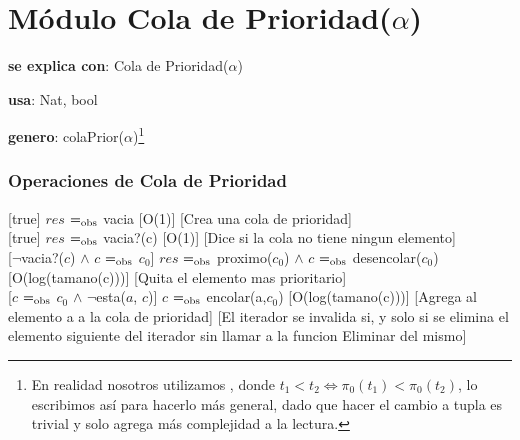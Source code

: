 


\section{Módulo Cola de Prioridad($\alpha$)}

\begin{Interfaz}

  \textbf{se explica con}: Cola de Prioridad($\alpha$)

  \textbf{usa}: Nat, bool
  
  \textbf{genero}: colaPrior($\alpha$)\footnote{En realidad nosotros utilizamos , donde $t_1 < t_2 \iff \pi_0(t_1) < \pi_0(t_2)$, lo escribimos así para hacerlo más general, dado que hacer el cambio a tupla es trivial y solo agrega más complejidad a la lectura.}


\subsubsection{Operaciones de Cola de Prioridad}

  [true]
  {$res$ $=_{\mathrm{obs}}$ vacia}
  [O(1)]
  [Crea una cola de prioridad]\\ 
  
  [true]
  {$res$ $=_{\mathrm{obs}}$ vacia?(c)}
  [O(1)]
  [Dice si la cola no tiene ningun elemento]\\ 

  [$\neg$vacia?($c$) $\land$ $c$ $=_{\mathrm{obs}}$ $c_0$]
  {$res$ $=_{\mathrm{obs}}$ proximo($c_0$) $\land$ $c$ $=_{\mathrm{obs}}$ desencolar($c_0$)}
  [O(log(tamano(c)))]
  [Quita el elemento mas prioritario]\\   
  
  [$c$ $=_{\mathrm{obs}}$ $c_0$ $\land$ $\neg$esta($a$, $c$)] %
  {$c$ $=_{\mathrm{obs}}$ encolar(a,$c_0$)}
  [O(log(tamano(c)))]
  [Agrega al elemento a a la cola de prioridad]
  [El iterador se invalida si, y solo si se elimina el elemento siguiente del iterador sin llamar a la funcion Eliminar del mismo]\\ 
\end{Interfaz}


